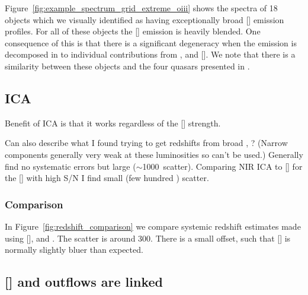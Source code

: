 Figure~\ref{fig:example_spectrum_grid_extreme_oiii} shows the spectra of 18 objects which we visually identified as having exceptionally broad [] emission profiles. 
For all of these objects the [] emission is heavily blended. 
One consequence of this is that there is a significant degeneracy when the emission is decomposed in to individual contributions from , \hb and []. 
We note that there is a similarity between these objects and the four quasars presented in \citet{zakamska16}. 






\subsection{\ac{ICA}}

Benefit of \ac{ICA} is that it works regardless of the [] strength. 

Can also describe what I found trying to get redshifts from broad \hans, \hbns? (Narrow components generally very weak at these luminosities so can't be used.)
Generally find no systematic errors but large ($\sim$1000\kms\, scatter).
Comparing NIR \ac{ICA} to [] for the [] with high \ac{S/N} I find small (few hundred \kms) scatter. 

\subsubsection{Comparison}

In Figure~\ref{fig:redshift_comparison} we compare systemic redshift estimates made using [], \hb and \ha. 
The scatter is around 300\kms. 
There is a small offset, such that [] is normally slightly bluer than expected. 

\subsection{[] and  outflows are linked}

